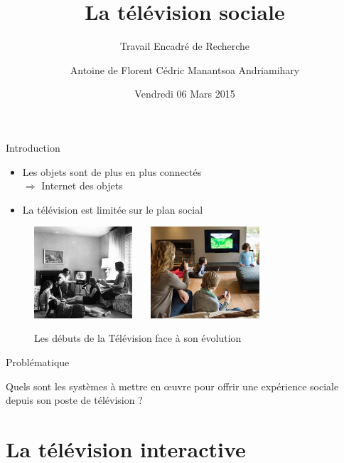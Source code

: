 \documentclass{beamer}
\title[] %
{La télévision sociale}
\subtitle{Travail Encadré de Recherche}
\author[
\textbf{F}lorent\\
\textbf{A}ntoine\\
\textbf{C}édric\\
Manan\textbf{T}soa
] %
{Antoine de \bsc{Roquemaurel}\newline Florent \bsc{Berbie}\newline Cédric \bsc{Rohaut}\newline Manantsoa Andriamihary \bsc{Razanajatovo}}
\institute[] %
{
  Universit\'e Toulouse III -- Paul Sabatier \\
  M1 Informatique -- Développement Logiciel 
  \vspace{-10px}
}
\date[ ~ ~ ~ 05 / 03 / 2015] %
{Vendredi 06 Mars 2015}
\begin{document}
	\begin{frame}
		\titlepage
	\end{frame} \begin{frame}{Introduction} \begin{itemize}
		\item Les objets sont de plus en plus connectés\\
			$\Rightarrow$ Internet des objets
		\pause
		\vfill
		\item La télévision est limitée sur le plan social
	\end{itemize}
		\vfill
			\begin{figure}[H]
				\centering
				\includegraphics[height=3.4cm]{images/intro/old.jpg}~~~
				\includegraphics[height=3.4cm]{images/intro/currently.jpg}
				\caption{Les débuts de la Télévision face à son évolution}
			\end{figure}
		\end{frame}
	\begin{frame}{Problématique}
		\Large
		\begin{center}
		Quels sont les systèmes à mettre en œuvre pour offrir une expérience sociale depuis son poste de télévision ?
	\end{center}
	\end{frame}
	\begin{frame}
		\tableofcontents
	\end{frame}
	\section{La télévision interactive}
\end{document}
